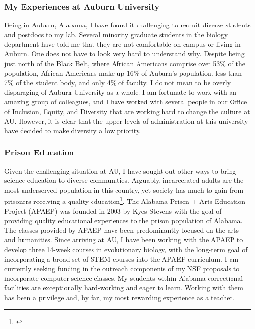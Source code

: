 \subsubsection*{My Experiences at Auburn University}
Being in Auburn, Alabama, I have found it challenging to recruit diverse
students and postdocs to my lab.
Several minority graduate students in the biology department have told me that
they are not comfortable on campus or living in Auburn.
One does not have to look very hard to understand why.
Despite being just north of the Black Belt,
where African Americans comprise over 53\% of the population,
African Americans make up
16\% of Auburn's population, less than 7\% of the student body,
and only 4\% of faculty.
I do not mean to be overly disparaging of Auburn University as a whole.
I am fortunate to work with an amazing group of colleagues, and
I have worked with several people in our Office of Inclusion, Equity, and
Diversity that are working hard to change the culture at AU.
However, it is clear that the upper levels of administration at this university
have decided to make diversity a low priority.


\subsubsection*{Prison Education}
Given the challenging situation at AU, I have sought out other ways to bring
science education to diverse communities.
Arguably, incarcerated adults are the most underserved population in this country,
yet society has much to gain from prisoners receiving a quality
education\footnote{\label{Vacca04}}.
The Alabama Prison + Arts Education Project (APAEP) was founded in 2003 by Kyes
Stevens with the goal of providing quality
educational experiences to the prison population of Alabama.
The classes provided by APAEP have been predominantly focused on the
arts and humanities.
Since arriving at AU, I have been working with the APAEP to develop three
14-week courses in evolutionary biology, with the long-term goal of
incorporating a broad set of STEM courses into the APAEP curriculum.
I am currently seeking funding in the outreach components of my NSF proposals
to incorporate computer science classes.
My students within Alabama correctional facilities are exceptionally
hard-working and eager to learn.
Working with them has been a privilege and, by far, my most rewarding
experience as a teacher.
